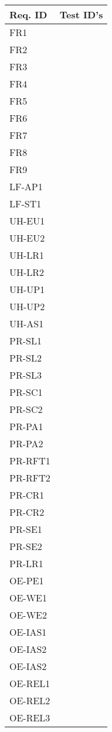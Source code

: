 \documentclass[12pt, titlepage]{article}
\begin{document}
\begin{longtable}{|l|l|}
  \hline
  \textbf{Req. ID} & \textbf{Test ID's} \\
  \hline
  FR1 & \\ \hline
  FR2 & \\ \hline
  FR3 & \\ \hline
  FR4 & \\ \hline
  FR5 & \\ \hline
  FR6 & \\ \hline
  FR7 & \\ \hline
  FR8 & \\ \hline
  FR9 & \\ \hline
  LF-AP1 & \\ \hline
  LF-ST1 & \\ \hline
  UH-EU1 & \\ \hline
  UH-EU2 & \\ \hline
  UH-LR1 & \\ \hline
  UH-LR2 & \\ \hline
  UH-UP1 & \\ \hline
  UH-UP2 & \\ \hline
  UH-AS1 & \\ \hline
  PR-SL1 & \\ \hline
  PR-SL2 & \\ \hline
  PR-SL3 & \\ \hline
  PR-SC1 & \\ \hline
  PR-SC2 & \\ \hline
  PR-PA1 & \\ \hline
  PR-PA2 & \\ \hline
  PR-RFT1 & \\ \hline
  PR-RFT2 & \\ \hline
  PR-CR1 & \\ \hline
  PR-CR2 & \\ \hline
  PR-SE1 & \\ \hline
  PR-SE2 & \\ \hline
  PR-LR1 & \\ \hline
  OE-PE1 & \\ \hline
  OE-WE1 & \\ \hline
  OE-WE2 & \\ \hline
  OE-IAS1 & \\ \hline
  OE-IAS2 & \\ \hline
  OE-IAS2 & \\ \hline
  OE-REL1 & \\ \hline
  OE-REL2 & \\ \hline
  OE-REL3 & \\ \hline

\end{longtable}
\end{document}
